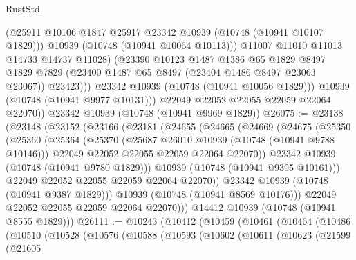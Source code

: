 \begin{lexlean}{RustStd}
\begin{coremodule}
{\begin{coremodule}
{{{{{                    (@25911 @10106 @1847 @25917 @23342 @10939 (@10748 (@10941 @10107 @1829)))
                    @10939
                    (@10748 (@10941 @10064 @10113)))
                  @11007
                  @11010
                  @11013
                  @14733
                  @14737
                  @11028)
                (@23390
                  @10123
                  @1487
                  @1386
                  @65
                  @1829
                  @8497
                  @1829
                  @7829
                  (@23400 @1487 @65 @8497 (@23404 @1486 @8497 @23063 @23067))
                  @23423)))
            @23342
            @10939
            (@10748 (@10941 @10056 @1829)))
          @10939
          (@10748 (@10941 @9977 @10131)))
        @22049
        @22052
        @22055
        @22059
        @22064
        @22070))
    @23342
    @10939
    (@10748 (@10941 @9969 @1829))
@26075 := @23138
    (@23148
      (@23152
        (@23166
          (@23181
            (@24655
              (@24665
                (@24669
                  (@24675
                    (@25350
                      (@25360
                        (@25364
                          (@25370
                            (@25687 @26010 @10939 (@10748 (@10941 @9788 @10146)))
                            @22049
                            @22052
                            @22055
                            @22059
                            @22064
                            @22070))
                        @23342
                        @10939
                        (@10748 (@10941 @9780 @1829)))
                      @10939
                      (@10748 (@10941 @9395 @10161)))
                    @22049
                    @22052
                    @22055
                    @22059
                    @22064
                    @22070))
                @23342
                @10939
                (@10748 (@10941 @9387 @1829)))
              @10939
              (@10748 (@10941 @8569 @10176)))
            @22049
            @22052
            @22055
            @22059
            @22064
            @22070)))
      @14412
      @10939
      (@10748 (@10941 @8555 @1829)))
@26111 := @10243
    (@10412
      (@10459
        (@10461
          (@10464
            (@10486
              (@10510
                (@10528
                  (@10576
                    (@10588
                      (@10593
                        (@10602
                          (@10611
                            (@10623
                              (@21599
                                (@21605
}}}}}
\end{coremodule}}
\end{coremodule}
\end{lexlean}
